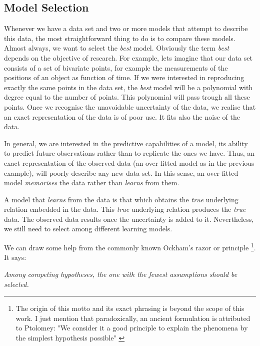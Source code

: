 \subsection{Model Selection}

Whenever we have a data set and two or more models that attempt to describe this data, the most straightforward thing to do is to compare these models. Almost always, we want to select the \emph{best} model. Obviously the term \emph{best} depends on the objective of research. For example, lets imagine that our data set consists of a set of bivariate points, for example the measurements of the positions of an object as function of time. If we were interested in reproducing exactly the same points in the data set, the \emph{best} model will be a polynomial with degree equal to the number of points. This polynomial will pass trough all these points. Once we recognise the unavoidable uncertainty of the data, we realise that an exact representation of the data is of poor use. It fits also the noise of the data. 

In general, we are interested in the predictive capabilities of a model, its ability to predict future observations rather than to replicate the ones we have. Thus, an exact representation of the observed data (an over-fitted model as in the previous example), will poorly describe any new data set. In this sense, an over-fitted model \emph{memorises} the data rather than \emph{learns} from them.

A model that \emph{learns} from the data is that which obtains the \emph{true} underlying relation embedded in the data. This \emph{true} underlying relation produces the \emph{true} data. The observed data results once the uncertainty is added to it. Nevertheless, we still need to select among different learning models.  

We can draw some help from the commonly known Ockham's razor or principle \footnote{The origin of this motto and its exact phrasing is beyond the scope of this work. I just mention that paradoxically, an ancient formulation is attributed to Ptolomey: "We consider it a good principle to explain the phenomena by the simplest hypothesis possible" \citep{Franklin2002}}. It says:

\textit{Among competing hypotheses, the one with the fewest assumptions should be selected.}

